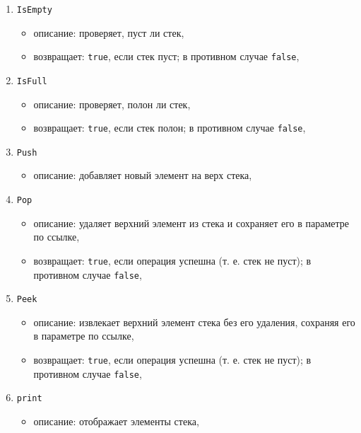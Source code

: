 \begin{enumerate}
	\item \texttt{IsEmpty}
	\begin{itemize}
		\item описание: проверяет, пуст ли стек,
		\item возвращает: \texttt{true}, если стек пуст; в противном случае \texttt{false},
	\end{itemize}
	
	\item \texttt{IsFull}
	\begin{itemize}
		\item описание: проверяет, полон ли стек,
		\item возвращает: \texttt{true}, если стек полон; в противном случае \texttt{false},
	\end{itemize}
	
	\item \texttt{Push}
	\begin{itemize}
		\item описание: добавляет новый элемент на верх стека,
	\end{itemize}
	
	\item \texttt{Pop}
	\begin{itemize}
		\item описание: удаляет верхний элемент из стека и сохраняет его в параметре по ссылке,
		\item возвращает: \texttt{true}, если операция успешна (т. е. стек не пуст); в противном случае \texttt{false},
	\end{itemize}
	
	\item \texttt{Peek}
	\begin{itemize}
		\item описание: извлекает верхний элемент стека без его удаления, сохраняя его в параметре по ссылке,
		\item возвращает: \texttt{true}, если операция успешна (т. е. стек не пуст); в противном случае \texttt{false},
	\end{itemize}
	
	\item \texttt{print}
	\begin{itemize}
		\item описание: отображает элементы стека,
	\end{itemize}
\end{enumerate}
